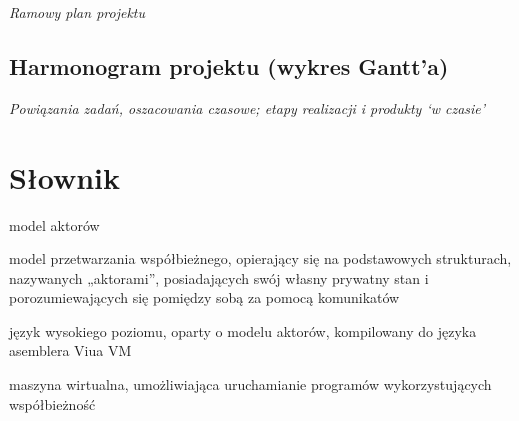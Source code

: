 \documentclass[11pt,oneside,a4paper,titlepage,onecolumn]{article}
\begin{document}
\emph{Ramowy plan projektu}

\subsection{Harmonogram projektu (wykres Gantt’a)}

\emph{Powiązania zadań, oszacowania czasowe; etapy realizacji i produkty ‘w czasie’}

\section{Słownik}

\begin{labeling}{model aktorów}
    \item [model aktorów] model przetwarzania współbieżnego, opierający się na podstawowych strukturach, nazywanych „aktorami”, posiadających swój własny prywatny stan i porozumiewających się pomiędzy sobą za pomocą komunikatów
    \item [ViuAct] język wysokiego poziomu, oparty o modelu aktorów, kompilowany do języka asemblera Viua VM
    \item [Viua VM] maszyna wirtualna, umożliwiająca uruchamianie programów wykorzystujących współbieżność
\end{labeling}
\end{document}
